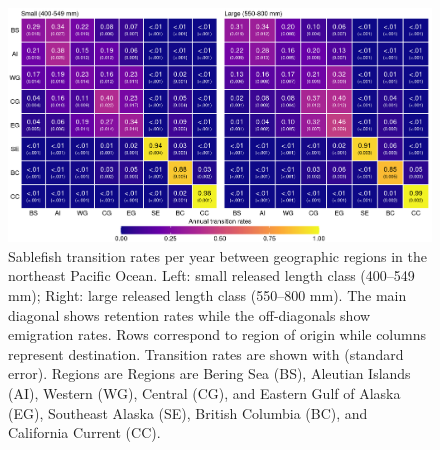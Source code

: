 \documentclass{article}
\begin{document}
\begin{figure}[htb]
    \centering
    \includegraphics[width = \textwidth]{heat-region-average-length}
    \caption{Sablefish transition rates per year between geographic regions in the northeast Pacific Ocean. Left: small released length class (400--549 mm); Right: large released length class (550--800 mm). The main diagonal shows retention rates while the off-diagonals show emigration rates. Rows correspond to region of origin while columns represent destination. Transition rates are shown with (standard error). Regions are Regions are Bering Sea (BS), Aleutian Islands (AI), Western (WG), Central (CG), and Eastern Gulf of Alaska (EG), Southeast Alaska (SE), British Columbia (BC), and California Current (CC).}
    \label{fig:heat-region-average-length}
\end{figure}
\end{document}

